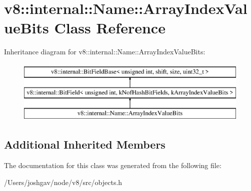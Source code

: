 \hypertarget{classv8_1_1internal_1_1_name_1_1_array_index_value_bits}{}\section{v8\+:\+:internal\+:\+:Name\+:\+:Array\+Index\+Value\+Bits Class Reference}
\label{classv8_1_1internal_1_1_name_1_1_array_index_value_bits}
Inheritance diagram for v8\+:\+:internal\+:\+:Name\+:\+:Array\+Index\+Value\+Bits\+:\begin{figure}[H]
\begin{center}
\leavevmode
\includegraphics[height=3.000000cm]{classv8_1_1internal_1_1_name_1_1_array_index_value_bits}
\end{center}
\end{figure}
\subsection*{Additional Inherited Members}


The documentation for this class was generated from the following file\+:\begin{DoxyCompactItemize}
\item 
/\+Users/joshgav/node/v8/src/objects.\+h\end{DoxyCompactItemize}
